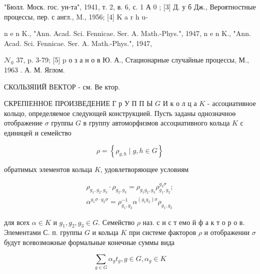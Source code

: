 \documentclass[10pt]{article}
\begin{document}
"Бюлл. Моск. гос. ун-та", 1941, т. 2, в. 6, с. 1 А 0 ; [3] Д. у б Дж., Вероятностные процессы, пер. с англ., M., 1956; [4] K a r h u-

n e n K., "Ann. Acad. Sci. Fennicae. Ser. A. Math.-Phys.", 1947, n e n K., "Ann. Acad. Sci. Fennicae. Ser. A. Math.-Phys.", 1947,

$\mathcal{N}_{0}$ 37, p. 3-79; [5] p о з а н о в Ю. А., Стационарные случайные процессы, М., 1963 . А. М. Яглом.



СКОЛЬЗЯІИЙ ВЕКТОР - см. Ве ктор.



СКРЕПІЕННОЕ ПРОИЗВЕДЕНИЕ Г р У П П Ы $G$ И к о л ц а $K$ - ассоциативное кольцо, определяемое следующей конструкцией. Пусть заданы однозначноө отображение $\sigma$ группы $G$ в группу автоморфизмов ассоциативного кольца $K$ с единицей и семейство



\[

\rho=\left\{\rho_{g, h} \mid g, h \in G\right\}

\]



обратимых элементов кольца $K$, удовлетворяющее условиям



\[

\begin{gathered}

\rho_{g_{1}, g_{2}, g_{3}} \cdot \rho_{g_{2}, g_{3}}=\rho_{g_{1} g_{2}, g_{3}} \rho_{g_{1}, g_{2}}^{g_{3} \sigma} ; \\

\alpha^{g_{1} \sigma \cdot g_{2} \sigma}=\rho_{g_{1}, g_{2}}^{-1} \alpha^{\left(g_{1} g_{2}\right) \sigma} \rho_{g_{1}, g_{2}}

\end{gathered}

\]



для всех $\alpha \in K$ и $g_{1}, g_{2}, g_{3} \in G$. Семейство $\rho$ наз. с и с т емо й ф а к т о р о в. Элементами С. п. группы $G$ и кольца $K$ при системе факторов $\rho$ и отображении $\sigma$ будут всевозможные формальные конечные суммы вида



\[

\sum_{g \in G} \alpha_{g} t_{g}, g \in G, \alpha_{g} \in K

\]
\end{document}
